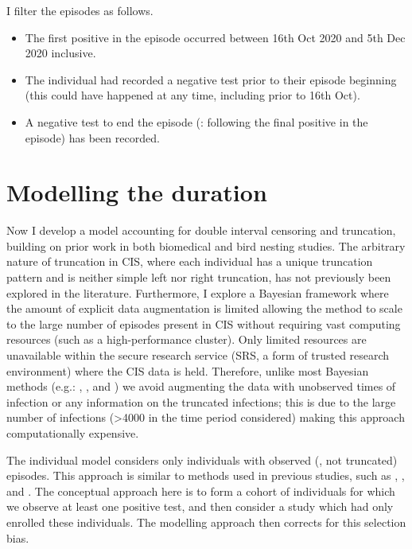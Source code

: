 \documentclass[main.tex]{subfiles}
\begin{document}
I filter the episodes as follows.
\begin{itemize}
\item
  The first positive in the episode occurred between 16th Oct 2020 and
  5th Dec 2020 inclusive.
\item
  The individual had recorded a negative test prior to their episode
  beginning (this could have happened at any time, including prior to
  16th Oct).
\item
  A negative test to end the episode (\ie: following the final positive in the episode) has been recorded.
\end{itemize}


\section{Modelling the duration}\label{perf-test:sec:model}
Now I develop a model accounting for double interval censoring and truncation, building on prior work in both biomedical and bird nesting studies.
The arbitrary nature of truncation in CIS, where each individual has a unique truncation pattern and is neither simple left nor right truncation, has not previously been explored in the literature.
Furthermore, I explore a Bayesian framework where the amount of explicit data augmentation is limited allowing the method to scale to the large number of episodes present in CIS without requiring vast computing resources (such as a high-performance cluster).
Only limited resources are unavailable within the secure research service (SRS, a form of trusted research environment) where the CIS data is held.
Therefore, unlike most Bayesian methods (e.g.: \textcite{heBayesiana}, \textcite{heBayesian}, and \textcite{caoModeling}) we avoid augmenting the data with unobserved times of infection or any information on the truncated infections; this is due to the large number of infections (>4000 in the time period considered) making this approach computationally expensive.

The individual model considers only individuals with observed (\ie, not truncated) episodes.
This approach is similar to methods used in previous studies, such as \textcite{heiseyModelling}, \textcite{dempsterMaximum}, and \textcite{turnbullEmpirical}.
The conceptual approach here is to form a cohort of individuals for which we observe at least one positive test, and then consider a study which had only enrolled these individuals.
The modelling approach then corrects for this selection bias.
\end{document}
